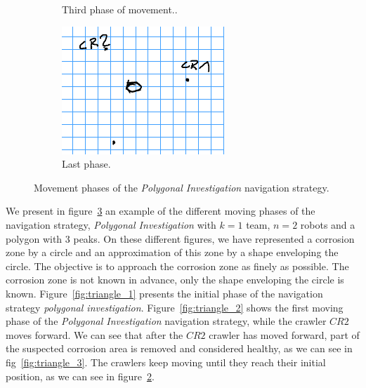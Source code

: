 \documentclass[english,RandD]{rapportPFE}  %
\begin{document}
\begin{figure}[h!]
\begin{subfigure}[t]{0.3\linewidth}
						\caption{Third phase of movement..}
						\label{fig:triangle_6}
					\end{subfigure}
					\hfill
					\begin{subfigure}[t]{0.3\linewidth}
						\centering
						\includegraphics[width=\linewidth]{graphics/triangle_7.png}
						\caption{Last phase.}
						\label{fig:triangle_7}
					\end{subfigure}
						\caption{Movement phases of the \textit{Polygonal Investigation} navigation strategy.}
						\label{fig:triangle}
				\end{figure}

				We present in figure~\ref{fig:triangle} an example of the different moving phases of the navigation strategy, \textit{Polygonal Investigation} with $k = 1$ team, $n = 2$ robots and a polygon with 3 peaks.
				On these different figures, we have represented a corrosion zone by a circle and an approximation of this zone by a shape enveloping the circle.
				The objective is to approach the corrosion zone as finely as possible.
				The corrosion zone is not known in advance, only the shape enveloping the circle is known.
				Figure~\ref{fig:triangle_1} presents the initial phase of the navigation strategy \textit{polygonal investigation}.
				Figure~\ref{fig:triangle_2} shows the first moving phase of the \textit{Polygonal Investigation} navigation strategy, while the crawler $CR2$ moves forward.
				We can see that after the $CR2$ crawler has moved forward, part of the suspected corrosion area is removed and considered healthy, as we can see in fig~\ref{fig:triangle_3}.
				The crawlers keep moving until they reach their initial position, as we can see in figure~\ref{fig:triangle_7}.
\end{document}
